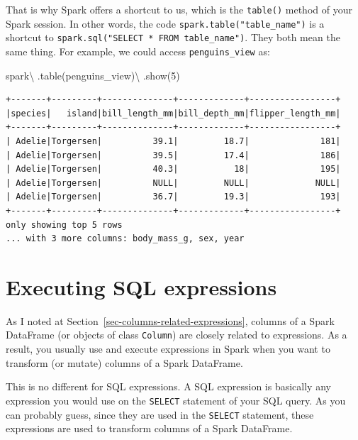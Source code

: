 \documentclass[
  11pt,
  letterpaper,
  DIV=11,
  numbers=noendperiod]{scrreprt}
\newenvironment{Shaded}{\begin{snugshade}}{\end{snugshade}}
\newcommand{\DecValTok}[1]{\textcolor[rgb]{0.68,0.00,0.00}{#1}}
\newcommand{\NormalTok}[1]{\textcolor[rgb]{0.00,0.23,0.31}{#1}}
\newcommand{\OperatorTok}[1]{\textcolor[rgb]{0.37,0.37,0.37}{#1}}
\newcommand{\StringTok}[1]{\textcolor[rgb]{0.13,0.47,0.30}{#1}}
\begin{document}
That is why Spark offers a shortcut to us, which is the \texttt{table()}
method of your Spark session. In other words, the code
\texttt{spark.table("table\_name")} is a shortcut to
\texttt{spark.sql("SELECT\ *\ FROM\ table\_name")}. They both mean the
same thing. For example, we could access \texttt{penguins\_view} as:

\begin{Shaded}
\begin{Highlighting}[]
\NormalTok{spark}\OperatorTok{\textbackslash{}}
\NormalTok{  .table(}\StringTok{\textquotesingle{}penguins\_view\textquotesingle{}}\NormalTok{)}\OperatorTok{\textbackslash{}}
\NormalTok{  .show(}\DecValTok{5}\NormalTok{)}
\end{Highlighting}
\end{Shaded}

\begin{verbatim}
+-------+---------+--------------+-------------+-----------------+
|species|   island|bill_length_mm|bill_depth_mm|flipper_length_mm|
+-------+---------+--------------+-------------+-----------------+
| Adelie|Torgersen|          39.1|         18.7|              181|
| Adelie|Torgersen|          39.5|         17.4|              186|
| Adelie|Torgersen|          40.3|           18|              195|
| Adelie|Torgersen|          NULL|         NULL|             NULL|
| Adelie|Torgersen|          36.7|         19.3|              193|
+-------+---------+--------------+-------------+-----------------+
only showing top 5 rows
... with 3 more columns: body_mass_g, sex, year
\end{verbatim}

\section{Executing SQL expressions}\label{executing-sql-expressions}

As I noted at Section~\ref{sec-columns-related-expressions}, columns of
a Spark DataFrame (or objects of class \texttt{Column}) are closely
related to expressions. As a result, you usually use and execute
expressions in Spark when you want to transform (or mutate) columns of a
Spark DataFrame.

This is no different for SQL expressions. A SQL expression is basically
any expression you would use on the \texttt{SELECT} statement of your
SQL query. As you can probably guess, since they are used in the
\texttt{SELECT} statement, these expressions are used to transform
columns of a Spark DataFrame.
\end{document}
